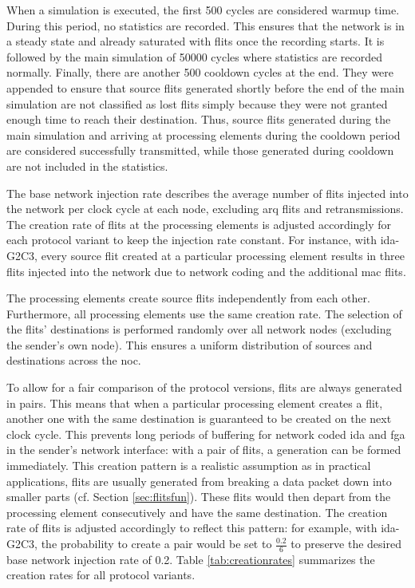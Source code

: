 When a simulation is executed, the first 500 cycles are considered warmup time. During this period, no statistics are recorded. This ensures that the
network is in a steady state and already saturated with flits once the recording starts. It is followed by the main simulation of \num{50000}
cycles where statistics are recorded normally. Finally, there are another 500 cooldown cycles at the end. They were appended to ensure that source flits
generated shortly before the end of the main simulation are not classified as lost flits simply because they were not granted enough time to reach their
destination. Thus, source flits generated during the main simulation and arriving at processing elements during the cooldown period are considered
successfully transmitted, while those generated during cooldown are not included in the statistics.

The base network injection rate describes the average number of flits injected into the network per clock cycle at each node, excluding \gls{arq}
flits and retransmissions. The creation rate of flits at the processing elements is adjusted accordingly for each protocol variant to keep the
injection rate constant. For instance, with \gls{ida}-G2C3, every source flit created at a particular processing element results in three flits
injected into the network due to network coding and the additional \gls{mac} flits.

The processing elements create source flits independently from each other. Furthermore, all processing elements use the same creation rate. The
selection of the flits' destinations is performed randomly over all network nodes (excluding the sender's own node). This ensures a uniform
distribution of sources and destinations across the \gls{noc}.

To allow for a fair comparison of the protocol versions, flits are always generated in pairs. This means that when a particular processing
element creates a flit, another one with the same destination is guaranteed to be created on the next clock cycle. This prevents long periods of
buffering for network coded \gls{ida} and \gls{fga} in the sender's network interface: with a pair of flits, a generation can be formed immediately.
This creation pattern is a realistic assumption as in practical applications, flits are usually generated from breaking a data packet down into
smaller parts (cf. Section \ref{sec:flitsfun}). These flits would then depart from the processing element consecutively and have the same
destination. The creation rate of flits is adjusted accordingly to reflect this pattern: for example, with \gls{ida}-G2C3, the probability to create a
pair would be set to $\frac{0.2}{6}$ to preserve the desired base network injection rate of 0.2. Table \vref{tab:creationrates} summarizes the
creation rates for all protocol variants.

